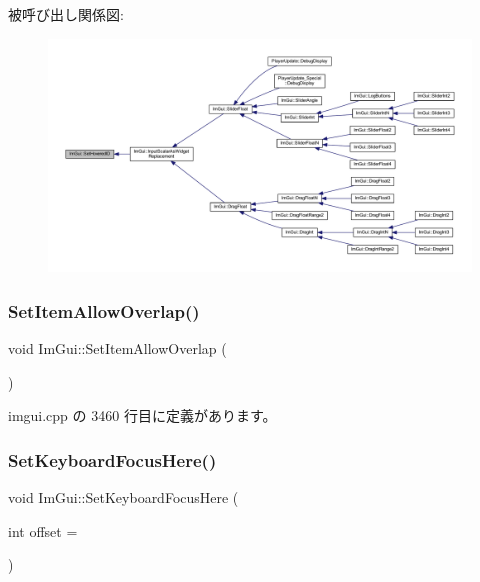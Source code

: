 被呼び出し関係図\+:\nopagebreak
\begin{figure}[H]
\begin{center}
\leavevmode
\includegraphics[width=350pt]{namespace_im_gui_aba1f0c75d6f98702e6b02eb1bc30d915_icgraph}
\end{center}
\end{figure}
\mbox{\label{namespace_im_gui_a3291356b06ebe5f771d60b334a831d4b}} 
\subsubsection{\texorpdfstring{Set\+Item\+Allow\+Overlap()}{SetItemAllowOverlap()}}
{\footnotesize\ttfamily void Im\+Gui\+::\+Set\+Item\+Allow\+Overlap (\begin{DoxyParamCaption}{ }\end{DoxyParamCaption})}



 imgui.\+cpp の 3460 行目に定義があります。

\mbox{\label{namespace_im_gui_ae85e5fba7e88cea8bd3ba5b687c979f2}} 
\subsubsection{\texorpdfstring{Set\+Keyboard\+Focus\+Here()}{SetKeyboardFocusHere()}}
{\footnotesize\ttfamily void Im\+Gui\+::\+Set\+Keyboard\+Focus\+Here (\begin{DoxyParamCaption}\item[{int}]{offset = {} }\end{DoxyParamCaption})}




